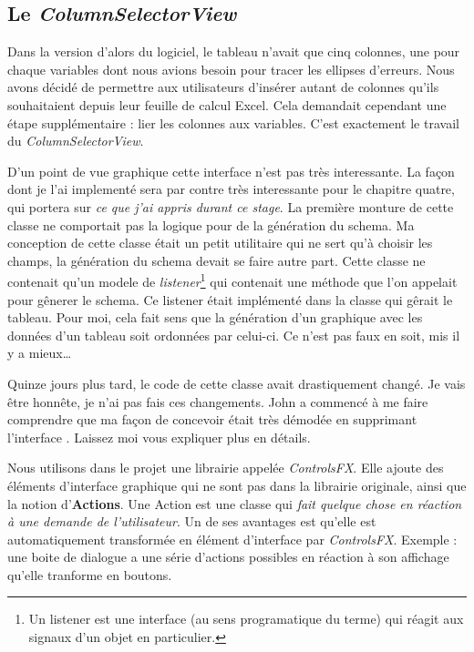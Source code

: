 %
%
\subsection{Le \textit{ColumnSelectorView}}
Dans la version d'alors du logiciel, le tableau n'avait que cinq colonnes, une pour chaque variables dont nous avions besoin pour tracer les ellipses d'erreurs. Nous avons décidé de permettre aux utilisateurs d'insérer autant de colonnes qu'ils souhaitaient depuis leur feuille de calcul Excel. Cela demandait cependant une étape supplémentaire : lier les colonnes aux variables. C'est exactement le travail du \textit{ColumnSelectorView}. 


D'un point de vue graphique cette interface n'est pas très interessante. La façon dont je l'ai implementé sera par contre très interessante pour le chapitre quatre, qui portera sur \textit{ce que j'ai appris durant ce stage}. La première monture de cette classe ne comportait pas la logique pour de la génération du schema. Ma conception de cette classe était un petit utilitaire qui ne sert qu'à choisir les champs, la génération du schema devait se faire autre part. Cette classe ne contenait qu'un modele de \textit{listener}\footnote{Un listener est une interface (au sens programatique du terme) qui réagit aux signaux d'un objet en particulier.} qui contenait une méthode que l'on appelait pour gênerer le schema. Ce listener était implémenté dans la classe qui gêrait le tableau. Pour moi, cela fait sens que la génération d'un graphique avec les données d'un tableau soit ordonnées par celui-ci. Ce n'est pas faux en soit, mis il y a mieux\ldots


Quinze jours plus tard, le code de cette classe avait drastiquement changé. Je vais être honnête, je n'ai pas fais ces changements. John a commencé à me faire comprendre que ma façon de concevoir était très démodée en supprimant l'interface %
. Laissez moi vous expliquer plus en détails.

Nous utilisons dans le projet une librairie appelée \textit{ControlsFX}. Elle ajoute des éléments d'interface graphique qui ne sont pas dans la librairie originale, ainsi que la notion d'\textbf{Actions}. Une Action est une classe qui \textit{fait quelque chose en réaction à une demande de l'utilisateur}. Un de ses avantages est qu'elle est automatiquement transformée en élément d'interface par \textit{ControlsFX}. Exemple : une boite de dialogue a une série d'actions possibles en réaction à son affichage qu'elle tranforme en boutons.

